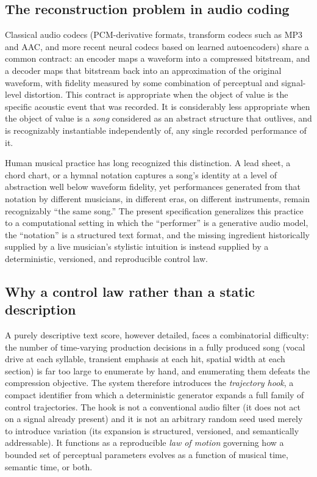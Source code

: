 \documentclass[11pt]{article}
\begin{document}
\subsection{The reconstruction problem in audio coding}

Classical audio codecs (PCM-derivative formats, transform codecs such as MP3 and AAC, and more recent neural codecs based on learned autoencoders) share a common contract: an encoder maps a waveform into a compressed bitstream, and a decoder maps that bitstream back into an approximation of the original waveform, with fidelity measured by some combination of perceptual and signal-level distortion. This contract is appropriate when the object of value is the specific acoustic event that was recorded. It is considerably less appropriate when the object of value is a \emph{song} considered as an abstract structure that outlives, and is recognizably instantiable independently of, any single recorded performance of it.

Human musical practice has long recognized this distinction. A lead sheet, a chord chart, or a hymnal notation captures a song's identity at a level of abstraction well below waveform fidelity, yet performances generated from that notation by different musicians, in different eras, on different instruments, remain recognizably ``the same song.'' The present specification generalizes this practice to a computational setting in which the ``performer'' is a generative audio model, the ``notation'' is a structured text format, and the missing ingredient historically supplied by a live musician's stylistic intuition is instead supplied by a deterministic, versioned, and reproducible control law.

\subsection{Why a control law rather than a static description}

A purely descriptive text score, however detailed, faces a combinatorial difficulty: the number of time-varying production decisions in a fully produced song (vocal drive at each syllable, transient emphasis at each hit, spatial width at each section) is far too large to enumerate by hand, and enumerating them defeats the compression objective. The system therefore introduces the \emph{trajectory hook}, a compact identifier from which a deterministic generator expands a full family of control trajectories. The hook is not a conventional audio filter (it does not act on a signal already present) and it is not an arbitrary random seed used merely to introduce variation (its expansion is structured, versioned, and semantically addressable). It functions as a reproducible \emph{law of motion} governing how a bounded set of perceptual parameters evolves as a function of musical time, semantic time, or both.
\end{document}
